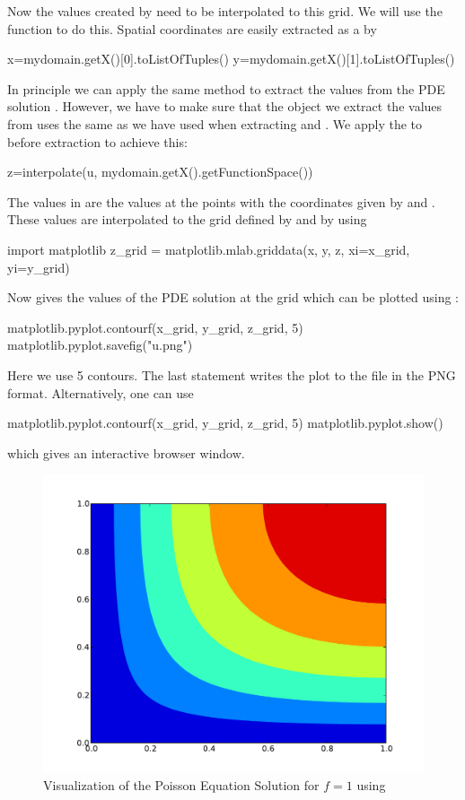 Now the values created by \escript need to be interpolated to this grid.
We will use the \MATPLOTLIB {} function to do this.
Spatial coordinates are easily extracted as a  by
\begin{python}
  x=mydomain.getX()[0].toListOfTuples()
  y=mydomain.getX()[1].toListOfTuples()
\end{python}
In principle we can apply the same  method to extract the values from the PDE solution .
However, we have to make sure that the \Data object we extract the values from
uses the same \FunctionSpace as we have used when extracting  and .
We apply the  to  before extraction to achieve this:
\begin{python}
  z=interpolate(u, mydomain.getX().getFunctionSpace())
\end{python}
The values in  are the values at the points with the coordinates given by  and .
These values are interpolated to the grid defined by  and  by using
\begin{python}
  import matplotlib
  z_grid = matplotlib.mlab.griddata(x, y, z, xi=x_grid, yi=y_grid)
\end{python}
Now  gives the values of the PDE solution  at the grid which can be plotted using :
\begin{python}
  matplotlib.pyplot.contourf(x_grid, y_grid, z_grid, 5)
  matplotlib.pyplot.savefig("u.png")
\end{python}
Here we use 5 contours. The last statement writes the plot to the file  in the PNG format.
Alternatively, one can use 
\begin{python}
  matplotlib.pyplot.contourf(x_grid, y_grid, z_grid, 5)
  matplotlib.pyplot.show()
\end{python}
which gives an interactive browser window.

\begin{figure}
\centerline{\includegraphics[width=\figwidth]{figures/FirstStepResultMATPLOTLIB}}
\caption{Visualization of the Poisson Equation Solution for $f=1$ using \MATPLOTLIB}
\label{fig:FirstSteps.3b}
\end{figure}

